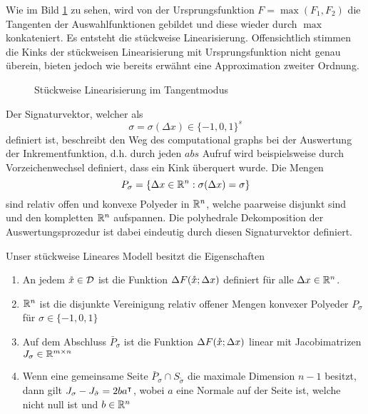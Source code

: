 Wie im Bild \ref{fig:piecewiseLinearization} zu sehen, wird von der  Ursprungsfunktion $F = \max(F_1,F_2)$ die Tangenten der Auswahlfunktionen gebildet und diese wieder durch $\max$ konkateniert. Es entsteht die stückweise Linearisierung. Offensichtlich stimmen die Kinks der stückweisen Linearisierung mit Ursprungsfunktion nicht genau überein, bieten jedoch wie bereits erwähnt eine Approximation zweiter Ordnung. 

\begin{figure}
\centering
 
 \caption{Stückweise Linearisierung im Tangentmodus}
\label{fig:piecewiseLinearization} 
\end{figure}


Der Signaturvektor, welcher als 
\[
 \sigma = \sigma(\Delta x) \in \lbrace -1,0,1\rbrace^s
\]
definiert ist, beschreibt den Weg des computational graphs bei der Auswertung der Inkrementfunktion, d.h. durch jeden $abs$ Aufruf wird beispielsweise durch Vorzeichenwechsel definiert, dass ein Kink überquert wurde. Die Mengen 
\[
 P_\sigma = \lbrace \Delta x \in \mathbb{R}^n:\sigma(\Delta x) = \sigma \rbrace
\]
sind relativ offen und konvexe Polyeder in $\mathbb{R}^n$, welche paarweise disjunkt sind und den kompletten $\mathbb{R}^n$ aufspannen.
Die polyhedrale Dekomposition der Auswertungsprozedur ist dabei eindeutig durch diesen Signaturvektor definiert.

Unser stückweise Lineares Modell besitzt die Eigenschaften
\cite[Prop. 2]{monster}
\begin{theorem}
 \begin{enumerate}
  \item An jedem $\mathring{x}\in \mathcal D$ ist die Funktion $\Delta F(\mathring{x};\Delta x)$ definiert für alle $\Delta x\in \mathbb{R}^n$.
  \item $\mathbb{R}^n$ ist die disjunkte Vereinigung relativ offener Mengen konvexer Polyeder $P_\sigma$ für $\sigma \in \lbrace -1,0,1\rbrace$
  \item Auf dem Abschluss $\bar P_\sigma$ ist die Funktion $\Delta F(\mathring{x};\Delta x)$ linear mit Jacobimatrizen $J_\sigma\in \mathbb{R}^{m\times n}$
  \item Wenn eine gemeinsame Seite $\bar P_\sigma \cap S_{\tilde \sigma}$ die maximale Dimension $n-1$ besitzt, dann gilt $J_\sigma - J_{\tilde \sigma} = 2ba^\intercal$, wobei $a$ eine Normale auf der Seite ist, welche nicht null ist und $b\in \mathbb{R}^n$
 \end{enumerate}
\end{theorem}



